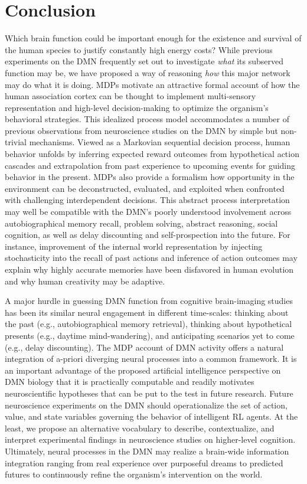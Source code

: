 \documentclass[10pt,letterpaper]{article}
\begin{document}
\section{Conclusion}
Which brain function could be important enough
for the existence and survival of the human species
to justify constantly high energy costs?
While previous experiments on the DMN frequently set out to investigate
\textit{what} its subserved function may be,
we have proposed a way of reasoning
\textit{how} this major network may do what it is doing.
%
MDPs motivate an attractive
formal account of how the human association cortex
can be thought to implement multi-sensory representation and high-level decision-making to
optimize the organism's behavioral strategies.
This idealized process model accommodates
a number of previous observations from neuroscience studies on the
DMN by simple but non-trivial mechanisms.
%
Viewed as a Markovian sequential decision process,
human behavior unfolds by inferring expected reward outcomes
from hypothetical action cascades
and extrapolation from past experience to
upcoming events for guiding behavior in the present.
MDPs also provide a formalism how
opportunity in the environment can be deconstructed, evaluated, and exploited
when confronted with challenging interdependent decisions.
%
This abstract process interpretation may well be compatible with the DMN's
poorly understood involvement across
autobiographical memory recall, problem solving,
abstract reasoning, social cognition,
as well as delay discounting and self-prospection into the future.
%
For instance, improvement of the internal world representation
by injecting stochasticity into the recall of past
actions and inference of action outcomes may explain why
highly accurate memories have been disfavored in human evolution
and why human creativity may be adaptive.




A major hurdle in guessing DMN function from cognitive brain-imaging studies has been its similar neural engagement in different time-scales: thinking about the past (e.g., autobiographical memory retrieval), thinking about hypothetical presents (e.g., daytime mind-wandering), and
anticipating scenarios yet to come (e.g., delay discounting).
The MDP account of DMN activity offers a natural integration of a-priori diverging neural processes into a common framework.
%
It is an important advantage of the proposed artificial intelligence perspective
on DMN biology that it is practically computable and
readily motivates neuroscientific hypotheses that can be put to the test in future research.
%
Future neuroscience experiments on the DMN should operationalize
the set of action, value, and state variables governing
the behavior of intelligent RL agents.
%
At the least, we propose an alternative vocabulary to
describe, contextualize, and interpret experimental findings in neuroscience studies
on higher-level cognition.
%
Ultimately,
neural processes in the DMN may realize a brain-wide information integration
ranging from real experience over purposeful dreams to predicted futures
to continuously refine the organism's intervention on the world.
\end{document}
